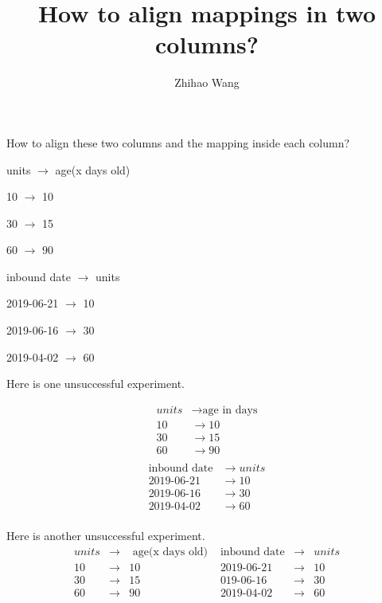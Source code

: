 \documentclass[12pt]{article}
\title{How to align mappings in two columns?}
\author{Zhihao Wang}
\begin{document}
\maketitle

How to align these two columns and the mapping inside each column?

\begin{multicols}{2}
units $\rightarrow$ age(x days old)

10 $\rightarrow$ 10

30 $\rightarrow$ 15

60 $\rightarrow$ 90

\columnbreak

inbound date $\rightarrow$ units

2019-06-21 $\rightarrow$ 10

2019-06-16 $\rightarrow$ 30

2019-04-02 $\rightarrow$ 60
\end{multicols}

Here is one unsuccessful experiment. 
\begin{multicols}{2}
\begin{align*}
    units & \rightarrow \text{age in days} \\ 
     10 & \rightarrow 10 \\ 
     30 & \rightarrow 15 \\ 
     60 & \rightarrow 90 \\ 
\end{align*}
\columnbreak
\begin{align*}
    \text{inbound date} & \rightarrow units \\ 
    \text{2019-06-21} & \rightarrow 10 \\ 
    \text{2019-06-16} & \rightarrow 30 \\ 
    \text{2019-04-02} & \rightarrow 60 \\ 
\end{align*}
\end{multicols}

Here is another unsuccessful experiment. 
\begin{equation*}
\begin{aligned}
    units & \rightarrow & \text{ age(x days old) }  & \text{inbound date} & \rightarrow & units \\
    10 & \rightarrow & 10                           & \text{2019-06-21} & \rightarrow & 10   \\
    30 & \rightarrow & 15                           & \text{019-06-16} & \rightarrow & 30   \\
    60 & \rightarrow & 90                           & \text{2019-04-02} & \rightarrow & 60   \\
\end{aligned}
\end{equation*}
\end{document}
